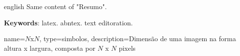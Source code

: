 \begin{resumo}[Abstract]
 \begin{otherlanguage*}{english}
   Same content of "Resumo".

   \vspace{\onelineskip}

   \noindent
   \textbf{Keywords}: latex. abntex. text editoration.
 \end{otherlanguage*}
\end{resumo}

%
%
%

\listoffigures*
\cleardoublepage


\listoftables*
\cleardoublepage

%
\printglossary[type=\acronymtype,title={List of Abbreviations}]
\cleardoublepage

%

{%
	name=$N$x$N$,
	type=simbolos,
	description={Dimensão de uma imagem na forma altura x largura, composta por $N$ x $N$ pixels}
}

